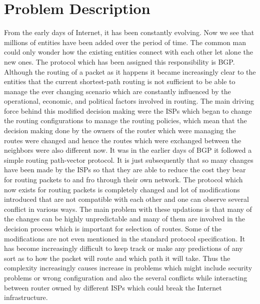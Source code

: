 \documentclass{sig-alternate-05-2015}
\begin{document}
\section{Problem Description}
From the early days of Internet, it has been constantly evolving. Now we see that millions of entities have been added over the period of time. The common man could only wonder how the existing entities connect with each other let alone the new ones. The protocol which has been assigned this responsibility is BGP. Although the routing of a packet as it happens it became increasingly clear to the entities that the current shortest-path routing is not sufficient to be able to manage the ever changing scenario which are constantly influenced by the operational, economic, and political factors involved in routing. The main driving force behind this modified decision making were the ISPs which began to change the routing configurations to manage the routing policies, which mean that the decision making done by the owners of the router which were managing the routes were changed and hence the routes which were exchanged between the neighbors were also different now. It was in the earlier days of BGP it followed a simple routing  path-vector protocol. It is just subsequently that so many changes have been made by the ISPs so that they are able to reduce the cost they bear for routing packets to and fro through their own network. The protocol which now exists for routing packets is completely changed and lot of modifications introduced that are not compatible with each other and one can observe several conflict in various ways. The main problem with these updations is that many of the changes can be highly unpredictable and many of them are involved in the decision process which is important for selection of routes. Some of the modifications are not even mentioned in the standard protocol specification. It has become increasingly difficult to keep track or make any predictions of any sort as to how the packet will route and which path it will take. Thus the complexity increasingly causes increase in problems which might include security problems or wrong configuration and also the several conflicts while interacting between router owned by different ISPs which could break the Internet infrastructure.
\end{document}

